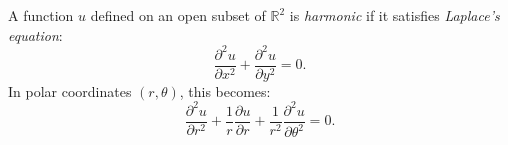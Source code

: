 A function $u$ defined on an open subset of $\mathbb{R}^2$ is \textit{harmonic} if it satisfies \textit{Laplace's equation}:
\[
\frac{\partial^2 u}{\partial x^2} + \frac{\partial^2 u}{\partial y^2} = 0.
\]
In polar coordinates $(r, \theta)$, this becomes:
\[
\frac{\partial^2 u}{\partial r^2} + \frac{1}{r}\frac{\partial u}{\partial r} + \frac{1}{r^2}\frac{\partial^2 u}{\partial \theta^2} = 0.
\]

